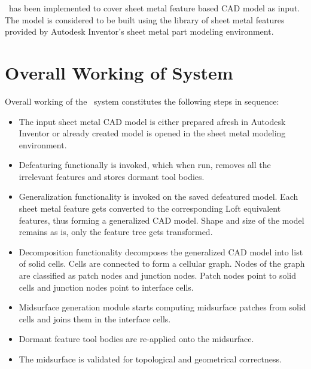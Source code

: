 \mysystemname~has been implemented to cover sheet metal feature based CAD model as input. The model is considered to be built using the library of sheet metal features provided by Autodesk Inventor's sheet metal part modeling environment.



\section{Overall Working of System} \label{sec:proposal:scope}

Overall working of the \mysystemname~system constitutes the following steps in sequence:
\begin{itemize}
\item The input sheet metal CAD model is either prepared afresh in Autodesk Inventor or already created model is opened in the sheet metal modeling environment.
\item Defeaturing functionally is invoked, which when run, removes all the irrelevant features and stores dormant tool bodies. 
\item Generalization functionality is invoked on the saved defeatured model. Each sheet metal feature gets converted to the corresponding Loft equivalent features, thus forming a generalized CAD model. Shape and size of the model remains as is, only the feature tree gets transformed.
\item Decomposition functionality decomposes the generalized CAD model into list of solid cells. Cells are connected to form a cellular graph. Nodes of the graph are classified as patch nodes and junction nodes. Patch nodes point to solid cells and junction nodes point to interface cells.
\item Midsurface generation module starts computing midsurface patches from solid cells and joins them in the interface cells.
\item Dormant feature tool bodies are re-applied onto the midsurface.
\item The midsurface is validated for topological and geometrical correctness.
\end{itemize}


